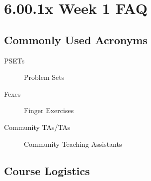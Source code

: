 \documentclass{article}
\begin{document}
	
	\section*{\Huge6.00.1x Week 1 FAQ}
	
	\subsection*{\LARGE Commonly Used Acronyms}
	
	\begin{description}
		\item[PSETs] Problem Sets
		
		\item[Fexes] Finger Exercises
		
		\item[Community TAs/TAs] Community Teaching Assistants
	\end{description}
	
	\subsection*{\LARGE Course Logistics}
	
\end{document}
